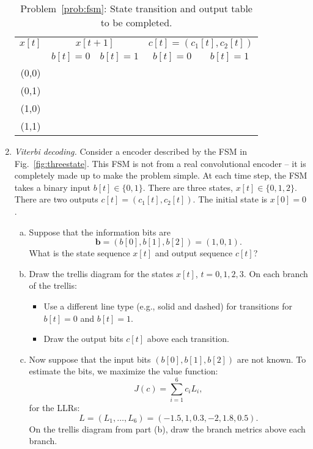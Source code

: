 \documentclass[11pt]{article}
\newcommand{\bs}[1]{{\boldsymbol{{#1}}}}
\begin{document}
\begin{enumerate}
\begin{table}
\begin{center}
\begin{tabular}{|c|c|c|c|c|}
\hline
$x[t]$ & \multicolumn{2}{|c|}{$x[t+1]$}
& \multicolumn{2}{|c|}{$c[t]=(c_1[t],c_2[t])$} \\ \cline{2-5}
 & $b[t]=0$ & $b[t]=1$ & $b[t]=0$ & $b[t]=1$ \\ \hline
(0,0) & & & &  \\ \hline
(0,1) & & & &  \\ \hline
(1,0) & & & &  \\ \hline
(1,1) & & & &  \\ \hline
\end{tabular}
\end{center}
\caption{Problem~\ref{prob:fsm}:  State transition
and output table to be completed.}
\label{tbl:fsmempty}
\end{table}




\pagebreak
\item \label{prob:viterbi} \emph{Viterbi decoding.}
Consider a encoder described by the FSM in Fig.~\ref{fig:threestate}.
This FSM is not from a real convolutional encoder --
it is completely made up to make the problem simple.
At each time step, the FSM takes a binary input
$b[t] \in \{0,1\}$.
There are three states, $x[t] \in \{0,1,2\}$.
There are two outputs $c[t]=(c_1[t],c_2[t])$.  The initial state
is $x[0]=0$.

\begin{enumerate}[(a)]
\item Suppose that the information bits are
\[
    \bs{b} = (b[0],b[1],b[2]) = (1,0,1).
\]
What is the state sequence $x[t]$ and output sequence $c[t]$?
\item Draw the trellis diagram for the states $x[t]$,
$t=0,1,2,3$.  On each branch of the trellis:
\begin{itemize}
\item Use a different
line type (e.g., solid and dashed) for transitions for $b[t]=0$
and $b[t]=1$.
\item Draw the output bits $c[t]$ above each transition.
\end{itemize}

\item Now suppose that the input bits $(b[0],b[1],b[2])$
are not known.  To estimate the bits,
we maximize the value function:
\[
    J(c) = \sum_{i=1}^6 c_i L_i,
\]
for the LLRs:
\[
    L=(L_1,\ldots,L_6) = (-1.5,1,0.3,-2,1.8,0.5).
\]
On the trellis diagram from part (b), draw the branch metrics
above each branch.


\end{enumerate}
\end{enumerate}
\end{document}
